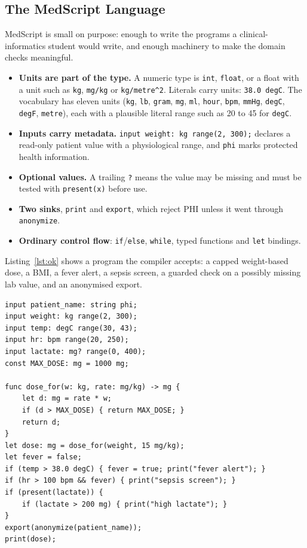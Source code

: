 \documentclass[12pt,a4paper]{article}
\newcommand{\code}[1]{\texttt{#1}}
\begin{document}
\subsection{The MedScript Language}

MedScript is small on purpose: enough to write the programs a clinical-informatics student would write, and enough
machinery to make the domain checks meaningful.

\begin{itemize}
    \item \textbf{Units are part of the type.} A numeric type is \code{int}, \code{float}, or a float with a unit such
    as \code{kg}, \code{mg/kg} or \code{kg/metre\textasciicircum 2}. Literals carry units: \code{38.0 degC}. The
    vocabulary has eleven units (\code{kg}, \code{lb}, \code{gram}, \code{mg}, \code{ml}, \code{hour}, \code{bpm},
    \code{mmHg}, \code{degC}, \code{degF}, \code{metre}), each with a plausible literal range such as 20 to 45 for \code{degC}.
    \item \textbf{Inputs carry metadata.} \code{input weight: kg range(2, 300);} declares a read-only patient value with
    a physiological range, and \code{phi} marks protected health information.
    \item \textbf{Optional values.} A trailing \code{?} means the value may be missing and must be tested with
    \code{present(x)} before use.
    \item \textbf{Two sinks}, \code{print} and \code{export}, which reject PHI unless it went through \code{anonymize}.
    \item \textbf{Ordinary control flow}: \code{if}/\code{else}, \code{while}, typed functions and \code{let} bindings.
\end{itemize}

Listing~\ref{lst:ok} shows a program the compiler accepts: a capped weight-based dose, a BMI, a fever alert, a sepsis
screen, a guarded check on a possibly missing lab value, and an anonymised export.

\begin{lstlisting}[language=MedScript,caption={A valid MedScript program (\texttt{examples/triage\_ok.med}).},label={lst:ok}]
input patient_name: string phi;
input weight: kg range(2, 300);
input temp: degC range(30, 43);
input hr: bpm range(20, 250);
input lactate: mg? range(0, 400);
const MAX_DOSE: mg = 1000 mg;

func dose_for(w: kg, rate: mg/kg) -> mg {
    let d: mg = rate * w;
    if (d > MAX_DOSE) { return MAX_DOSE; }
    return d;
}
let dose: mg = dose_for(weight, 15 mg/kg);
let fever = false;
if (temp > 38.0 degC) { fever = true; print("fever alert"); }
if (hr > 100 bpm && fever) { print("sepsis screen"); }
if (present(lactate)) {
    if (lactate > 200 mg) { print("high lactate"); }
}
export(anonymize(patient_name));
print(dose);
\end{lstlisting}
\end{document}

